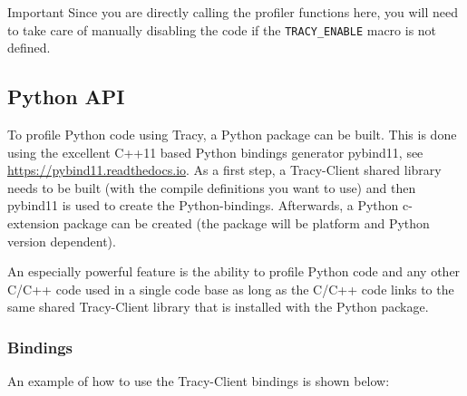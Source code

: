 \documentclass[hidelinks,titlepage,a4paper,twoside]{article}
\begin{document}
\begin{bclogo}[
noborder=true,
couleur=black!5,
logo=\bcbombe
]{Important}
Since you are directly calling the profiler functions here, you will need to take care of manually
disabling the code if the \texttt{TRACY\_ENABLE} macro is not defined.
\end{bclogo}

\subsection{Python API}
\label{pythonapi}

To profile Python code using Tracy, a Python package can be built. This is done using the excellent C++11 based Python bindings generator pybind11, see \url{https://pybind11.readthedocs.io}.
As a first step, a Tracy-Client shared library needs to be built (with the compile definitions you want to use) and then pybind11 is used to create the Python-bindings.
Afterwards, a Python c-extension package can be created (the package will be platform and Python version dependent).

An especially powerful feature is the ability to profile Python code and any other C/C++ code used in a single code base as long as the C/C++ code links to the same shared Tracy-Client library that is installed with the Python package.

\subsubsection{Bindings}

An example of how to use the Tracy-Client bindings is shown below:
\end{document}
